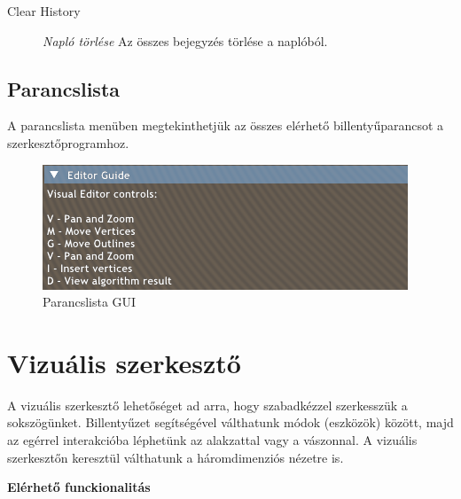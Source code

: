 \begin{description}
    \item[Clear History] \textit{Napló törlése} Az összes bejegyzés törlése a naplóból.
\end{description}

\subsection{Parancslista}

A parancslista menüben megtekinthetjük az összes elérhető billentyűparancsot a szerkesztőprogramhoz.

\begin{figure}[H]
    \centering
    \includegraphics[width=1\linewidth]{images/user_guide.png}
    \caption{Parancslista GUI}
    \label{fig:user_guide-1}
\end{figure}


\section{Vizuális szerkesztő}\label{sec:visual_editor}

A vizuális szerkesztő lehetőséget ad arra, hogy szabadkézzel szerkesszük a sokszögünket. Billentyűzet segítségével válthatunk módok (eszközök) között, majd az egérrel interakcióba léphetünk az alakzattal vagy a vászonnal. A vizuális szerkesztőn keresztül válthatunk a háromdimenziós nézetre is.

\textbf{Elérhető funckionalitás}

